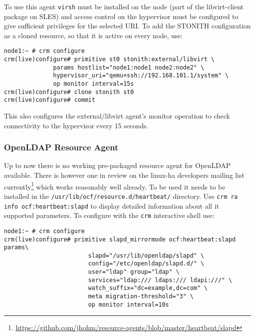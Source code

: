 \documentclass[a4paper,11pt,DIV=12]{scrartcl}
\begin{document}
    To use this agent \verb|virsh| must be installed on the node (part of the
    libvirt-client package on SLES) and access control on the hypervisor must
    be configured to give sufficient privileges for the selected URI. To add
    the STONITH configuration as a cloned resource, so that it is active on
    every node, use:
    \begin{verbatim}
node1:~ # crm configure
crm(live)configure# primitive st0 stonith:external/libvirt \
              params hostlist="node1:node1 node2:node2" \
              hypervisor_uri="qemu+ssh://192.168.101.1/system" \
              op monitor interval=15s
crm(live)configure# clone stonith st0
crm(live)configure# commit
    \end{verbatim}
    This also configures the external/libvirt agent's monitor operation
    to check connectivity to the hypervisor every 15 seconds.

\subsubsection{OpenLDAP Resource Agent}
    Up to now there is no working pre-packaged resource agent for OpenLDAP
    available. There is however one in review on the linux-ha developers
    mailing list
    currently\footnote{\url{https://github.com/jhohm/resource-agents/blob/master/heartbeat/slapd}}
    which works reasonably well already. To be used it needs to be
    installed in the \verb|/usr/lib/ocf/resource.d/heartbeat/| directory.
    Use \verb|crm ra info ocf:heartbeat:slapd| to display detailed information
    about all it supported parameters. To configure with the \verb|crm|
    interactive shell use:
    \begin{verbatim}
node1:~ # crm configure
crm(live)configure# primitive slapd_mirrormode ocf:heartbeat:slapd params\
                        slapd="/usr/lib/openldap/slapd" \
                        config="/etc/openldap/slapd.d/" \
                        user="ldap" group="ldap" \
                        services="ldap:/// ldaps:/// ldapi:///" \
                        watch_suffix="dc=example,dc=com" \
                        meta migration-threshold="3" \
                        op monitor interval=10s
    \end{verbatim}
\end{document}
